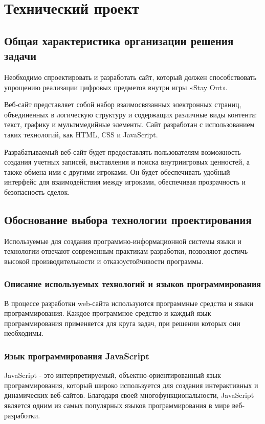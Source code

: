 \section{Технический проект}
\subsection{Общая характеристика организации решения задачи}

Необходимо спроектировать и разработать сайт, который должен способствовать упрощению реализации цифровых предметов внутри игры «Stay Out».

Веб-сайт представляет собой набор взаимосвязанных электронных страниц, объединенных в логическую структуру и содержащих различные виды контента: текст, графику и мультимедийные элементы. Сайт разработан с использованием таких технологий, как HTML, CSS и JavaScript.

Разрабатываемый веб-сайт будет предоставлять пользователям возможность создания учетных записей, выставления и поиска внутриигровых ценностей, а также обмена ими с другими игроками. Он будет обеспечивать удобный интерфейс для взаимодействия между игроками, обеспечивая прозрачность и безопасность сделок.

\subsection{Обоснование выбора технологии проектирования}

Используемые для создания программно-информационной системы языки и технологии отвечают современным практикам разработки, позволяют достичь высокой производительности и отказоустойчивости программы.

\subsubsection{Описание используемых технологий и языков программирования}

В процессе разработки web-сайта используются программные средства и языки программирования. Каждое программное средство и каждый язык программирования применяется для круга задач, при решении которых они необходимы.

\subsubsection{Язык программирования JavaScript}

JavaScript - это интерпретируемый, объектно-ориентированный язык программирования, который широко используется для создания интерактивных и динамических веб-сайтов. Благодаря своей многофункциональности, JavaScript является одним из самых популярных языков программирования в мире веб-разработки.

